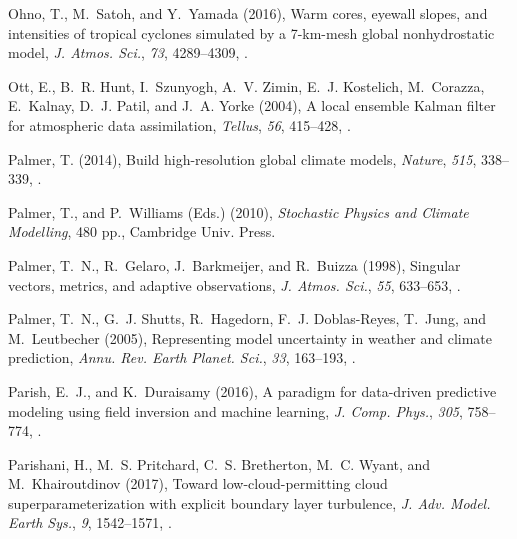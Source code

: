 \documentclass[draft]{agujournal}
\begin{document}
\begin{thebibliography}{196}
Ohno, T., M.~Satoh, and Y.~Yamada (2016), Warm cores, eyewall slopes, and
  intensities of tropical cyclones simulated by a 7-km-mesh global
  nonhydrostatic model, \textit{J. Atmos. Sci.}, \textit{73}, 4289--4309,
  .

Ott, E., B.~R. Hunt, I.~Szunyogh, A.~V. Zimin, E.~J. Kostelich, M.~Corazza,
  E.~Kalnay, D.~J. Patil, and J.~A. Yorke (2004), A local ensemble {K}alman
  filter for atmospheric data assimilation, \textit{Tellus}, \textit{56},
  415--428, .

Palmer, T. (2014), Build high-resolution global climate models,
  \textit{Nature}, \textit{515}, 338--339, .

Palmer, T., and P.~Williams (Eds.) (2010), \textit{Stochastic Physics and
  Climate Modelling}, 480 pp., Cambridge Univ. Press.

Palmer, T.~N., R.~Gelaro, J.~Barkmeijer, and R.~Buizza (1998), Singular
  vectors, metrics, and adaptive observations, \textit{J. Atmos. Sci.},
  \textit{55}, 633--653, .

Palmer, T.~N., G.~J. Shutts, R.~Hagedorn, F.~J. Doblas-Reyes, T.~Jung, and
  M.~Leutbecher (2005), Representing model uncertainty in weather and climate
  prediction, \textit{Annu. Rev. Earth Planet. Sci.}, \textit{33}, 163--193,
  .

Parish, E.~J., and K.~Duraisamy (2016), A paradigm for data-driven predictive
  modeling using field inversion and machine learning, \textit{J. Comp. Phys.},
  \textit{305}, 758--774, .

Parishani, H., M.~S. Pritchard, C.~S. Bretherton, M.~C. Wyant, and
  M.~Khairoutdinov (2017), Toward low-cloud-permitting cloud
  superparameterization with explicit boundary layer turbulence, \textit{J.
  Adv. Model. Earth Sys.}, \textit{9}, 1542--1571, .


\end{thebibliography}
\end{document}
